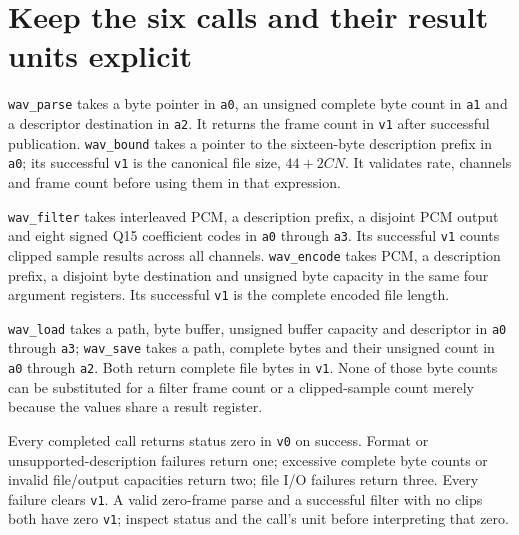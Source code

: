 \section{Keep the six calls and their result units explicit}
\texttt{wav\_parse} takes a byte pointer in \texttt{a0}, an unsigned complete byte count
in \texttt{a1} and a descriptor destination in \texttt{a2}. It returns the frame count
in \texttt{v1} after successful publication. \texttt{wav\_bound} takes a pointer to the
sixteen-byte description prefix in \texttt{a0}; its successful \texttt{v1} is the
canonical file size, $44+2CN$. It validates rate, channels and frame count before using
them in that expression.

\texttt{wav\_filter} takes interleaved PCM, a description prefix, a disjoint PCM
output and eight signed Q15 coefficient codes in \texttt{a0} through \texttt{a3}.
Its successful \texttt{v1} counts clipped sample results across all channels.
\texttt{wav\_encode} takes PCM, a description prefix, a disjoint byte destination
and unsigned byte capacity in the same four argument registers. Its successful
\texttt{v1} is the complete encoded file length.

\texttt{wav\_load} takes a path, byte buffer, unsigned buffer capacity and descriptor
in \texttt{a0} through \texttt{a3}; \texttt{wav\_save} takes a path, complete bytes
and their unsigned count in \texttt{a0} through \texttt{a2}. Both return complete file
bytes in \texttt{v1}. None of those byte counts can be substituted for a filter frame
count or a clipped-sample count merely because the values share a result register.

Every completed call returns status zero in \texttt{v0} on success. Format or
unsupported-description failures return one; excessive complete byte counts or invalid
file/output capacities return two; file I/O failures return three. Every failure clears
\texttt{v1}. A valid zero-frame parse and a successful filter with no clips both have
zero \texttt{v1}; inspect status and the call's unit before interpreting that zero.
